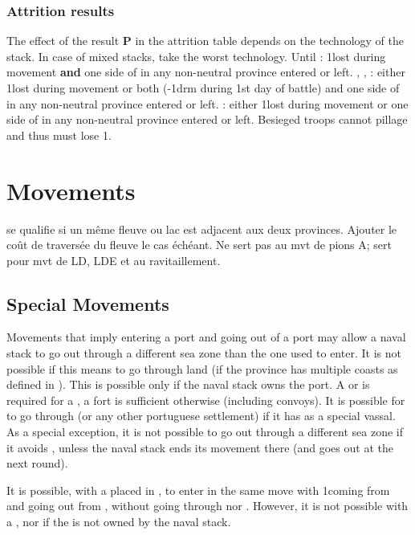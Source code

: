 \subsubsection{Attrition results}
\aparag The effect of the result \textbf{P} in the attrition table depends on
the technology of the stack. In case of mixed stacks, take the worst technology.
\bparag Until \TARQ: 1\LD lost during movement \textbf{and} one side of
\PILLAGE in any non-neutral province entered or left.
\bparag \TMUS, \TBAR, \TMAN: either 1\LD lost during movement or both
 (-1drm during 1st day of battle) and one side of \PILLAGE in
any non-neutral province entered or left.
\bparag \TL: either 1\LD lost during movement or one side of \PILLAGE in any
non-neutral province entered or left.
\bparag Besieged troops cannot pillage and thus must lose 1\LD.

\section{Movements}
se qualifie si un même fleuve ou lac est adjacent
aux deux provinces. Ajouter le coût de traversée du
fleuve le cas échéant.
\bparag Ne sert pas au mvt de pions A; sert pour mvt de LD, LDE
et au ravitaillement.

\subsection{Special Movements}\label{chMilitary:Movement:Special Movements}
\label{chMilitary:Movement:Port Multiple
  Coasts} Movements that imply entering a port and going out of a port
may allow a naval stack to go out through a different sea zone than the
one used to enter.
\bparag It is not possible if this means to go through land (if the
province has multiple coasts as defined in ).
\bparag This is possible only if the naval stack owns the port. A \COL
or \TP is required for a \FLEET, a fort is sufficient otherwise
(including convoys).
\bparag[Portugal] It is possible for \SPA to go through  (or any other portuguese settlement) if it has 
as a special vassal.
 As a special exception, it is not possible to go out
through a different sea zone if it avoids , unless the
naval stack ends its movement there (and goes out at the next round).

\begin{exemple}
  It is possible, with a \TP placed in , to enter in the same
  move with 1\NWD coming from  and going out from
  , without going through  nor
  . However, it is not possible with a \FLEET, nor if
  the \TP is not owned by the naval stack.
\end{exemple}

